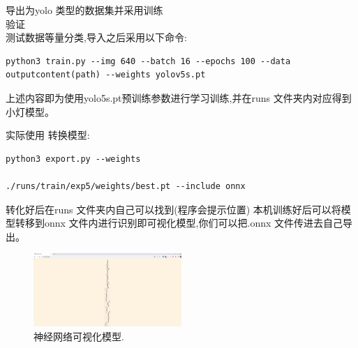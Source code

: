 \documentclass[12pt, a4paper, oneside]{article}
\begin{document}
导出为yolo 类型的数据集并采⽤训练\\验证\\测试数据等量分类,导⼊之后采⽤以下命令:

\begin{lstlisting}
python3 train.py --img 640 --batch 16 --epochs 100 --data outputcontent(path) --weights yolov5s.pt
\end{lstlisting}

上述内容即为使⽤yolo5s.pt预训练参数进⾏学习训练,并在runs ⽂件夹内对应得到小灯模型。

实际使⽤
转换模型:

\begin{lstlisting}
python3 export.py --weights

./runs/train/exp5/weights/best.pt --include onnx
\end{lstlisting}

转化好后在runs ⽂件夹内⾃⼰可以找到(程序会提⽰位置)
本机训练好后可以将模型转移到onnx ⽂件内进⾏识别即可视化模型,你们可以把.onnx ⽂件传进去⾃⼰导出。

\begin{figure}[H]
    \centering
    \includegraphics[width=0.5\textwidth]{image-14.png}
    \caption{神经网络可视化模型.}
    \label{神经网络可视化模型}
\end{figure}


\begin{figure}[H]
    \centering
\end{figure}
\end{document}
